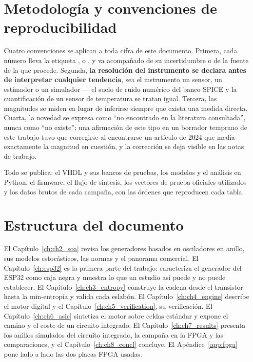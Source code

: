 \section{Metodología y convenciones de reproducibilidad}
\label{sec:conventions}

Cuatro convenciones se aplican a toda cifra de este documento. Primera,
cada número lleva la etiqueta \meas{}, \simu{} o \est{}, y va acompañado
de su incertidumbre o de la fuente de la que procede. Segunda,
\textbf{la resolución del instrumento se declara antes de interpretar
cualquier tendencia}, sea el instrumento un sensor, un estimador o un
simulador --- el suelo de ruido numérico del banco SPICE y la
cuantificación de un sensor de temperatura se tratan igual. Tercera, las
magnitudes se miden en lugar de inferirse siempre que exista una medida
directa. Cuarta, la novedad se expresa como ``no encontrado en la
literatura consultada'', nunca como ``no existe''; una afirmación de este
tipo en un borrador temprano de este trabajo tuvo que corregirse al
encontrarse un artículo de 2024 que medía exactamente la magnitud en
cuestión, y la corrección se deja visible en las notas de trabajo.

Todo se publica: el VHDL y sus bancos de pruebas, los modelos y el
análisis en Python, el firmware, el flujo de síntesis, los vectores de
prueba oficiales utilizados y los datos brutos de cada campaña, con las
órdenes que reproducen cada tabla.

\section{Estructura del documento}
\label{sec:structure}

El Capítulo~\ref{ch:ch2_soa} revisa los generadores basados en
osciladores en anillo, sus modelos estocásticos, las normas y el panorama
comercial. El Capítulo~\ref{ch:esp32} es la primera parte del trabajo:
caracteriza el generador del ESP32 como caja negra y muestra lo que un
estudio así puede y no puede establecer. El Capítulo~\ref{ch:ch3_entropy}
construye la cadena desde el
transistor hasta la min-entropía y valida cada eslabón. El
Capítulo~\ref{ch:ch4_engine} describe el motor digital y el
Capítulo~\ref{ch:ch5_verification}, su verificación. El
Capítulo~\ref{ch:ch6_asic} sintetiza el motor sobre celdas estándar y
expone el camino y el coste de un circuito integrado. El
Capítulo~\ref{ch:ch7_results} presenta los anillos simulados del
circuito integrado, la campaña en la FPGA y las comparaciones, y el
Capítulo~\ref{ch:ch8_concl} concluye. El Apéndice~\ref{app:fpga} pone
lado a lado las dos placas FPGA usadas.
